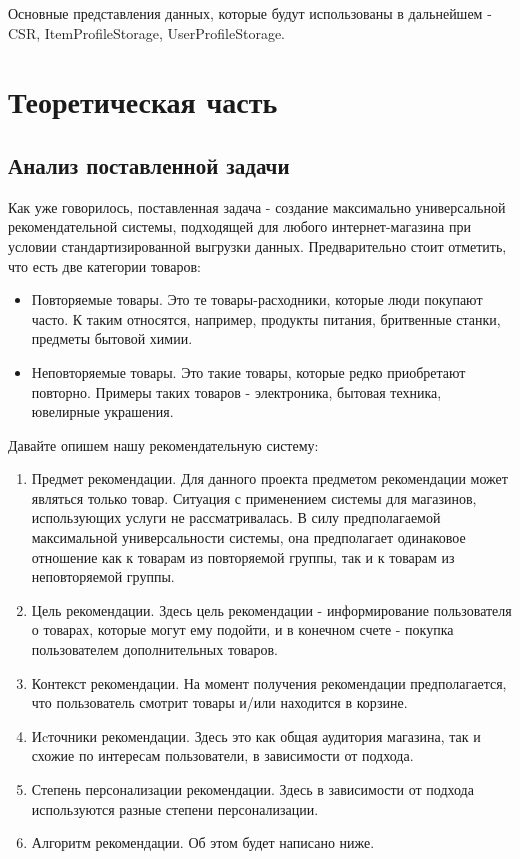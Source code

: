 \documentclass[14pt]{mmcs_article}
\begin{document}
Основные представления данных, которые будут использованы в дальнейшем - CSR, ItemProfileStorage, UserProfileStorage.


\section{Теоретическая часть}\label{dsfs}
\subsection{Анализ поставленной задачи}
Как уже говорилось, поставленная задача - создание максимально универсальной рекомендательной системы, подходящей для любого интернет-магазина при условии стандартизированной выгрузки данных.
Предварительно стоит отметить, что есть две категории товаров:
\begin{itemize}
	\item Повторяемые товары. Это те товары-расходники, которые люди покупают часто. К таким относятся, например, продукты питания, бритвенные станки, предметы бытовой химии.
	\item  Неповторяемые товары. Это такие товары, которые редко приобретают повторно. Примеры таких товаров - электроника, бытовая техника, ювелирные украшения.
\end{itemize}
Давайте опишем нашу рекомендательную систему: \cite{stud:kimfalk1}
\begin{enumerate}
\item Предмет рекомендации. Для данного проекта предметом рекомендации может являться только товар. Ситуация с применением системы для магазинов, использующих услуги не рассматривалась. В силу предполагаемой максимальной универсальности системы, она предполагает одинаковое отношение как к товарам из повторяемой группы, так и к товарам из неповторяемой группы.
\item Цель рекомендации. Здесь цель рекомендации - информирование пользователя о товарах, которые могут ему подойти, и в конечном счете - покупка пользователем дополнительных товаров.
\item Контекст рекомендации. На момент получения рекомендации предполагается, что пользователь смотрит товары и/или находится в корзине.
\item Иcточники рекомендации. Здесь это как общая аудитория магазина, так и схожие по интересам пользователи, в зависимости от подхода.
\item Степень персонализации рекомендации. Здесь в зависимости от подхода используются разные степени персонализации.
\item Алгоритм рекомендации. Об этом будет написано ниже. 
\end{enumerate}
\end{document}
